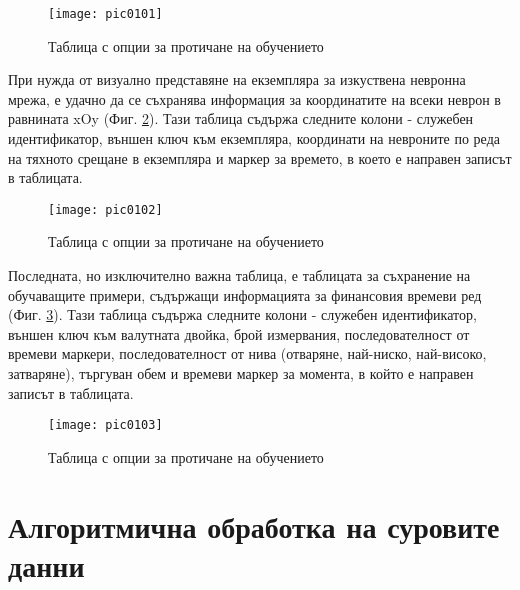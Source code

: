 \begin{figure}[h]
  \centering
  \texttt{[image: pic0101]}
  \caption{Таблица с опции за протичане на обучението}
\label{fig:pic0101}
\end{figure}
\FloatBarrier

При нужда от визуално представяне на екземпляра за изкуствена невронна мрежа, е удачно да се съхранява информация за координатите на всеки неврон в равнината xOy (Фиг. \ref{fig:pic0102}). Тази таблица съдържа следните колони - служебен идентификатор, външен ключ към екземпляра, координати на невроните по реда на тяхното срещане в екземпляра и маркер за времето, в което е направен записът в таблицата. 

\begin{figure}[h]
  \centering
  \texttt{[image: pic0102]}
  \caption{Таблица с опции за протичане на обучението}
\label{fig:pic0102}
\end{figure}
\FloatBarrier

Последната, но изключително важна таблица, е таблицата за съхранение на обучаващите примери, съдържащи информацията за финансовия времеви ред (Фиг. \ref{fig:pic0103}). Тази таблица съдържа следните колони - служебен идентификатор, външен ключ към валутната двойка, брой измервания, последователност от времеви маркери, последователност от нива (отваряне, най-ниско, най-високо, затваряне), търгуван обем и времеви маркер за момента, в който е направен записът в таблицата. 

\begin{figure}[h]
  \centering
  \texttt{[image: pic0103]}
  \caption{Таблица с опции за протичане на обучението}
\label{fig:pic0103}
\end{figure}
\FloatBarrier

\section{Алгоритмична обработка на суровите данни}

